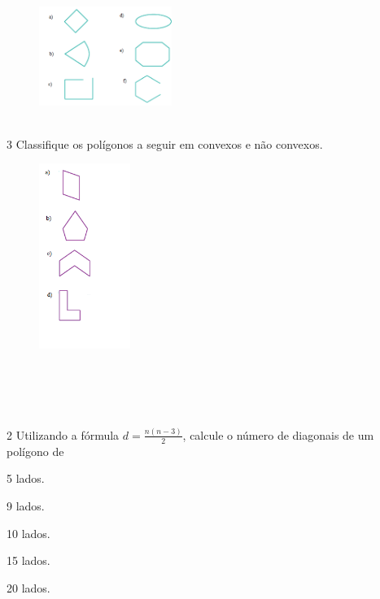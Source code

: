 \begin{figure}[H]
\centering\includegraphics[width=1.7in,height=1.26763in]{./imgSAEB_8_MAT/media/image7.png}
\end{figure}
\\

\num{3} Classifique os polígonos a seguir em convexos e não convexos.

\begin{figure}[H]
\centering\includegraphics[width=1.16236in,height=2.36667in]{./imgSAEB_8_MAT/media/image8.png}
\end{figure}

\\
\\
\\
\\

\num{2} Utilizando a fórmula $d = \frac{n(n - 3)}{2}$, calcule o número
de diagonais de um polígono de

\begin{escolha}[itemsep=0pt]
\item 5 lados.
\item 9 lados.
\item 10 lados.
\item 15 lados.
\item 20 lados.
\end{escolha}

